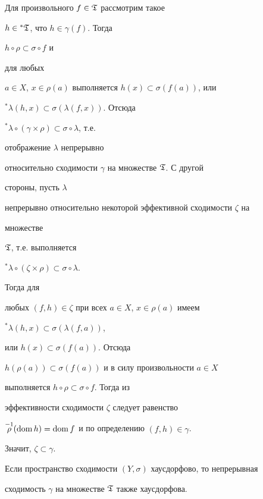 \begin{pf}


Для произвольного $f\in\frak T$ рассмотрим такое


$h\in{}^*\frak T$, что $h\in\gamma(f)$. Тогда


$h\circ \rho\subset\sigma\circ f$ и


для любых


$a\in X$, $x\in\rho(a)$ выполняется $h(x)\subset\sigma(f(a))$, или


${}^*\lambda(h,x)\subset\sigma(\lambda(f,x))$. Отсюда


${}^*\lambda\circ (\gamma\times\rho)\subset\sigma\circ \lambda$, т.е.


отображение $\lambda$ непрерывно


относительно сходимости $\gamma$ на множестве $\frak T$. С другой


стороны, пусть $\lambda$


непрерывно относительно некоторой эффективной сходимости $\zeta$ на


множестве


$\frak T$, т.е. выполняется


${}^*\lambda\circ (\zeta\times\rho)\subset\sigma\circ \lambda$.


Тогда для


любых $(f,h)\in\zeta$ при всех $a\in X$, $x\in\rho(a)$ имеем


${}^*\lambda(h,x)\subset\sigma(\lambda(f,a))$,


или $h(x)\subset\sigma(f(a))$. Отсюда


$h(\rho(a))\subset\sigma(f(a))$ и в силу произвольности $a\in X$


выполняется $h\circ \rho\subset\sigma\circ f$. Тогда из


эффективности сходимости $\zeta$ следует равенство


$\overset{-1}{\rho}{} (\operatorname{dom} h)=\operatorname{dom} f$ и по определению $(f,h)\in\gamma$.


Значит, $\zeta\subset\gamma$.


\end{pf}





\begin{prop}


Если пространство сходимости $(Y,\sigma)$ хаусдорфово, то непрерывная


сходимость $\gamma$ на множестве $\frak T$ также хаусдорфова.


\end{prop}





